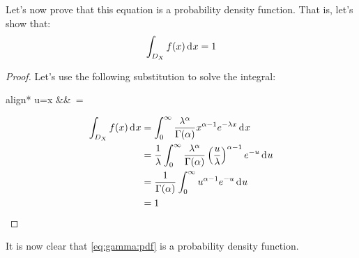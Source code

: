 \documentclass[12pt]{article}
\begin{document}
Let's now prove that this equation is a probability density function. That is, let's show that:
\begin{equation}
	\int_{D_X} f(x)\mathop{}\!\mathrm{d^{}}x = 1
\end{equation}
\begin{proof}
	Let's use the following substitution to solve the integral:
	\begin{empheq}[box=\widefbox]{align*}
		u=\lambda x	&&\,	=\lambda{}
	\end{empheq}
	\begin{equation}
		\begin{split}
			\int_{D_X} f(x)\mathop{}\!\mathrm{d^{}}x	&=	\int^\infty_0\frac{\lambda^\alpha}{\Gamma(\alpha)}x^{\alpha -1}e^{-\lambda x}\mathop{}\!\mathrm{d^{}}x\\
									&=	\frac{1}{\lambda}\int^\infty_0\frac{\lambda^\alpha}{\Gamma(\alpha)}\left(\frac{u}{\lambda}\right)^{\alpha-1}e^{-u}\mathop{}\!\mathrm{d^{}}u\\
									&=	\frac{1}{\Gamma(\alpha)}\int^\infty_0 u^{\alpha-1}e^{-u}\mathop{}\!\mathrm{d^{}}u\\
									&=	1
		\end{split}
	\end{equation}
\end{proof}
It is now clear that \autoref{eq:gamma:pdf} is a probability density function.


\pagebreak
\end{document}
